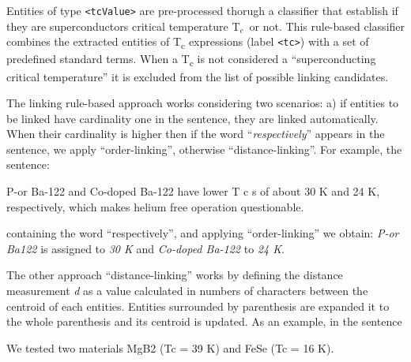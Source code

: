 \documentclass{article}
\newcommand{\tc}{T$_{c}$}
\begin{document}
Entities of type \texttt{<tcValue>} are pre-processed thorugh a classifier that establish if they are superconductors critical temperature \tc~or not. 
This rule-based classifier combines the extracted entities of T\textsubscript{c} expressions (label \texttt{<tc>}) with a set of predefined standard terms. 
When a T\textsubscript{c} is not considered a ``superconducting critical temperature'' it is excluded from the list of possible linking candidates. 

The linking rule-based approach works considering two scenarios: a) if entities to be linked have cardinality one in the sentence, they are linked automatically. 
When their cardinality is higher then if the word ``\textit{respectively}'' appears in the sentence, we apply ``order-linking'', otherwise ``distance-linking''. 
For example, the sentence:  
\begin{displayquote}
P-or Ba-122  and Co-doped Ba-122 have lower T c s of about 30 K and 24 K, respectively, which makes helium free operation questionable.
\end{displayquote}
containing the word ``respectively'', and applying ``order-linking'' we obtain: \textit{P-or Ba122} is assigned to \textit{30 K} and \textit{Co-doped Ba-122} to \textit{24 K}.


The other approach ``distance-linking'' works by defining the distance measurement \textit{d} as a value calculated in numbers of characters between the centroid of each entities. 
Entities surrounded by parenthesis are expanded it to the whole parenthesis and its centroid is updated. 
As an example, in the sentence
\begin{displayquote}
We tested two materials MgB2 (Tc = 39 K) and FeSe (Tc = 16 K).
\end{displayquote}
\end{document}
